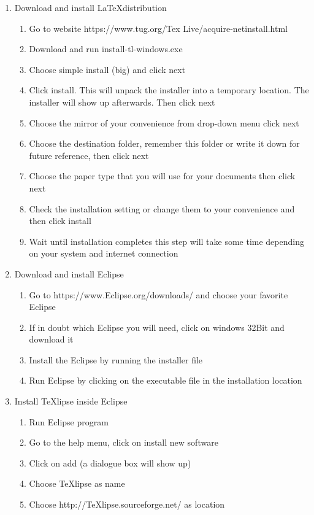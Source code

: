 \documentclass{memoir}
\begin{document}
\begin{enumerate}
  \item Download and install \LaTeX  distribution
\begin{enumerate}
  \item Go to website https://www.tug.org/Tex Live/acquire-netinstall.html 
  \item Download and run install-tl-windows.exe
  \item Choose simple install (big) and click next
  \item Click install. This will unpack the installer into a temporary location. The installer will show up afterwards. Then click next
  \item Choose the mirror of your convenience from drop-down menu click next
  \item Choose the destination folder, remember this folder or write it down for future reference, then click next
  \item Choose the paper type that you will use for your documents then click next
  \item Check the installation setting or change them to your convenience and then click install
  \item Wait until installation completes this step will take some time depending on your system and internet connection
\end{enumerate}
\item Download and install Eclipse
\begin{enumerate}
  \item Go to https://www.Eclipse.org/downloads/ and choose your favorite Eclipse
  \item If in doubt which Eclipse you will need, click on windows 32Bit and download it
  \item Install the Eclipse by running the installer file
  \item Run Eclipse by clicking on the executable file in the installation location
\end{enumerate}
  \item Install TeXlipse inside Eclipse
  \begin{enumerate}
    \item Run Eclipse program 
    \item Go to the help menu, click on install new software
    \item Click on add (a dialogue box will show up)
    \item Choose TeXlipse as name
    \item Choose http://TeXlipse.sourceforge.net/ as location

\end{enumerate}
\end{enumerate}
\end{document}
